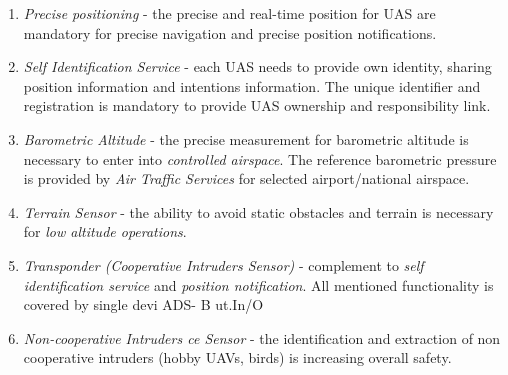 \begin{enumerate}
    \item \emph{Precise positioning} - the precise and real-time position for UAS are mandatory for precise navigation and precise position notifications. 
    
    \item \emph{Self Identification Service} - each UAS needs to provide own identity, sharing position information and intentions information. The unique identifier and registration is mandatory to provide UAS ownership and responsibility link.
    
    \item \emph{Barometric Altitude} - the precise measurement for barometric altitude is necessary to enter into \emph{controlled airspace}. The reference barometric pressure is provided by \emph{Air Traffic Services} for selected airport/national airspace.
    
    \item \emph{Terrain Sensor} - the ability to avoid static obstacles and terrain is necessary for \emph{low altitude operations}.
    
    \item \emph{Transponder (Cooperative Intruders Sensor)} - complement to \emph{self identification service} and \emph{position notification}. All mentioned functionality is covered by single devi
  ADS-  
 B ut.In/O   \item \emph{Non-cooperative Intruders ce Sensor} - the identification and extraction of non cooperative intruders (hobby UAVs, birds) is increasing overall safety.
\end{enumerate}